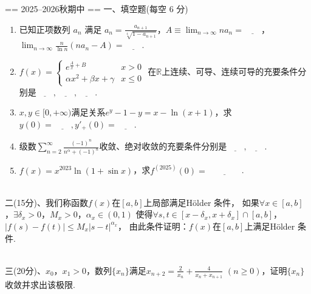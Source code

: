 == 2025--2026秋期中 ==
一、填空题(每空 6 分)
\begin{enumerate}
    \item[(1)]  已知正项数列 $a_n$ 满足 $a_n=\displaystyle\frac{a_{n+1}}{\sqrt[4]{1-a_{n+1}}}$，$A \equiv \displaystyle\lim _{n \to \infty} n a_n = \underline{\qquad}$，
                $\displaystyle\lim_{n \to \infty} \frac{n}{\ln n} (n a_n - A) = \underline{\qquad}$.
    \item[(2)] 
    $f(x)= \begin{cases}e^{\frac{A}{x}+B} & x>0 \\ \alpha x^{2}+\beta x+\gamma & x \leq0\end{cases}$
    在$\mathbb{R}$上连续、可导、连续可导的充要条件分别是$\underline{\qquad},\underline{\qquad},\underline{\qquad}$.
    \item[(3)] $x, y \in [0,+\infty)$满足关系$e^{y}-1-y=x-\ln (x+1)$，求$y(0)=\underline{\qquad},y'_+(0)=\underline{\qquad}$.
    \item[(4)] 级数$\displaystyle\sum_{n=2}^{\infty} \frac{(-1)^{n}}{n^{\alpha}+(-1)^{n}}$收敛、绝对收敛的充要条件分别是$\underline{\qquad},\underline{\qquad}$.
    \item[(5)] $f(x) = x^{2023} \ln(1 + \sin x)$，求$f^{(2025)}(0) = \underline{\qquad\qquad}$.
\end{enumerate}
~\\
二(15分)、我们称函数$f(x)$在$[a, b]$上局部满足Hölder 条件，
如果$\forall x \in[a, b]$，$\exists \delta_{x}>0$，$M_{x}>0$，$\alpha_{x} \in(0,1)$
使得$\forall s, t \in[x-\delta_{x}, x+\delta_{x}]\cap[a,b]$，$|f(s)-f(t)| \leq M_{x}|s-t|^{\alpha_{x}}$，
由此条件证明：$f(x)$在$[a, b]$上满足Hölder 条件.

~\\
三(20分)、$x_{0}$，$x_{1}>0$，数列$\{x_{n}\}$满足$x_{n+2}=\displaystyle\frac{2}{x_{n}}+\displaystyle\frac{4}{x_{n}+x_{n+1}}$ $(n \geq0)$，证明$\{x_{n}\}$收敛并求出该极限.

